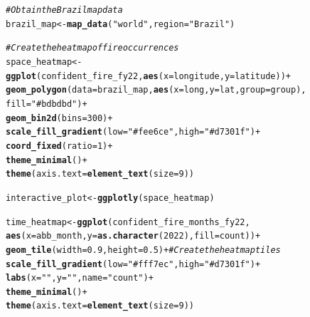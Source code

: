 \documentclass{article}\usepackage[]{graphicx}\usepackage[]{xcolor}
\makeatletter
\newcommand{\hlnum}[1]{\textcolor[rgb]{0.686,0.059,0.569}{#1}}%
\newcommand{\hlstr}[1]{\textcolor[rgb]{0.192,0.494,0.8}{#1}}%
\newcommand{\hlcom}[1]{\textcolor[rgb]{0.678,0.584,0.686}{\textit{#1}}}%
\newcommand{\hlopt}[1]{\textcolor[rgb]{0,0,0}{#1}}%
\newcommand{\hlstd}[1]{\textcolor[rgb]{0.345,0.345,0.345}{#1}}%
\newcommand{\hlkwb}[1]{\textcolor[rgb]{0.69,0.353,0.396}{#1}}%
\newcommand{\hlkwc}[1]{\textcolor[rgb]{0.333,0.667,0.333}{#1}}%
\newcommand{\hlkwd}[1]{\textcolor[rgb]{0.737,0.353,0.396}{\textbf{#1}}}%
\newenvironment{kframe}{%
 \def\at@end@of@kframe{}%
 \ifinner\ifhmode%
  \def\at@end@of@kframe{\end{minipage}}%
  \begin{minipage}{\columnwidth}%
 \fi\fi%
 \def\FrameCommand##1{\hskip\@totalleftmargin \hskip-\fboxsep
 \colorbox{shadecolor}{##1}\hskip-\fboxsep
     \hskip-\linewidth \hskip-\@totalleftmargin \hskip\columnwidth}%
 \MakeFramed {\advance\hsize-\width
   \@totalleftmargin\z@ \linewidth\hsize
   \@setminipage}}%
 {\par\unskip\endMakeFramed%
 \at@end@of@kframe}
\newenvironment{knitrout}{}{} %
\makeatother
\begin{document}
\begin{knitrout}
\color{fgcolor}\begin{kframe}
\begin{alltt}
\hlcom{# Obtain the Brazil map data}
\hlstd{brazil_map} \hlkwb{<-} \hlkwd{map_data}\hlstd{(}\hlstr{"world"}\hlstd{,} \hlkwc{region} \hlstd{=} \hlstr{"Brazil"}\hlstd{)}

\hlcom{# Create the heatmap of fire occurrences}
\hlstd{space_heatmap} \hlkwb{<-} \hlkwd{ggplot}\hlstd{(confident_fire_fy22,} \hlkwd{aes}\hlstd{(}\hlkwc{x} \hlstd{= longitude,} \hlkwc{y} \hlstd{= latitude))} \hlopt{+}
  \hlkwd{geom_polygon}\hlstd{(}\hlkwc{data} \hlstd{= brazil_map,} \hlkwd{aes}\hlstd{(}\hlkwc{x} \hlstd{= long,} \hlkwc{y} \hlstd{= lat,} \hlkwc{group} \hlstd{= group),}
               \hlkwc{fill} \hlstd{=} \hlstr{"#bdbdbd"}\hlstd{)} \hlopt{+}
  \hlkwd{geom_bin2d}\hlstd{(}\hlkwc{bins} \hlstd{=} \hlnum{300}\hlstd{)} \hlopt{+}
  \hlkwd{scale_fill_gradient}\hlstd{(}\hlkwc{low} \hlstd{=} \hlstr{"#fee6ce"}\hlstd{,} \hlkwc{high} \hlstd{=} \hlstr{"#d7301f"}\hlstd{)} \hlopt{+}
  \hlkwd{coord_fixed}\hlstd{(}\hlkwc{ratio} \hlstd{=} \hlnum{1}\hlstd{)} \hlopt{+}
  \hlkwd{theme_minimal}\hlstd{()}\hlopt{+}
  \hlkwd{theme}\hlstd{(}\hlkwc{axis.text} \hlstd{=} \hlkwd{element_text}\hlstd{(}\hlkwc{size} \hlstd{=} \hlnum{9}\hlstd{))}
\end{alltt}


{\ttfamily\noindent\bfseries\color{errorcolor}{\#\# Error in eval(expr, envir, enclos): object 'confident\_fire\_fy22' not found}}\begin{alltt}
\hlstd{interactive_plot} \hlkwb{<-} \hlkwd{ggplotly}\hlstd{(space_heatmap)}
\end{alltt}


{\ttfamily\noindent\bfseries\color{errorcolor}{\#\# Error in eval(expr, envir, enclos): object 'space\_heatmap' not found}}\begin{alltt}
\hlstd{time_heatmap} \hlkwb{<-} \hlkwd{ggplot}\hlstd{(confident_fire_months_fy22,}
                       \hlkwd{aes}\hlstd{(}\hlkwc{x} \hlstd{= abb_month,} \hlkwc{y} \hlstd{=} \hlkwd{as.character}\hlstd{(}\hlnum{2022}\hlstd{),} \hlkwc{fill} \hlstd{= count))} \hlopt{+}
  \hlkwd{geom_tile}\hlstd{(}\hlkwc{width} \hlstd{=} \hlnum{0.9}\hlstd{,} \hlkwc{height} \hlstd{=} \hlnum{0.5}\hlstd{)} \hlopt{+}  \hlcom{# Create the heatmap tiles}
  \hlkwd{scale_fill_gradient}\hlstd{(}\hlkwc{low} \hlstd{=} \hlstr{"#fff7ec"}\hlstd{,} \hlkwc{high} \hlstd{=} \hlstr{"#d7301f"}\hlstd{)} \hlopt{+}
  \hlkwd{labs}\hlstd{(}\hlkwc{x} \hlstd{=} \hlstr{" "}\hlstd{,} \hlkwc{y} \hlstd{=} \hlstr{" "}\hlstd{,} \hlkwc{name} \hlstd{=} \hlstr{"count"}\hlstd{)} \hlopt{+}
  \hlkwd{theme_minimal}\hlstd{()} \hlopt{+}
  \hlkwd{theme}\hlstd{(}\hlkwc{axis.text} \hlstd{=} \hlkwd{element_text}\hlstd{(}\hlkwc{size} \hlstd{=} \hlnum{9}\hlstd{))}
\end{alltt}



\end{kframe}
\end{knitrout}
\end{document}

